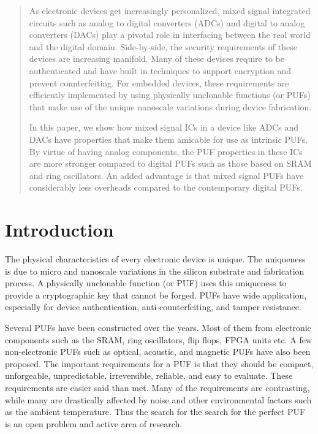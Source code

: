 \begin{abstract}
As electronic devices get increasingly personalized,
mixed signal integrated circuits such as analog to digital converters (ADCs)
and digital to analog converters (DACs) play a pivotal role in interfacing 
between the real world and the digital domain. Side-by-side, the security
requirements of these devices are increasing manifold. Many of these devices
require to be authenticated and have built in techniques to support 
encryption and prevent counterfeiting. For embedded devices, 
these requirements are efficiently implemented by 
using physically unclonable functions (or PUFs) that make use of the 
unique nanoscale variations during device fabrication.

In this paper, we show how mixed signal ICs in a device like ADCs and DACs 
have properties that make them amicable for use as intrinsic PUFs. By
virtue of having analog components, the PUF properties in these ICs
are more stronger compared to digital PUFs such as those based on
SRAM and ring oscillators. An added advantage is that mixed signal PUFs
have considerably less overheads compared to the contemporary digital PUFs. 
\end{abstract}

\section{Introduction}
The physical characteristics of every electronic device is unique.
The uniqueness is due to micro and nanoscale variations in the 
silicon substrate and fabrication process. A physically unclonable function 
(or PUF) uses this uniqueness to provide a cryptographic key that 
cannot be forged. PUFs have wide application, especially for device
authentication, anti-counterfeiting, and tamper resistance.

Several PUFs have been constructed over the years. Most of them
from electronic components such as the SRAM, ring oscillators, flip flops,
FPGA units etc. A few non-electronic PUFs such as optical, acoustic,
and magnetic PUFs have also been proposed. The important requirements
for a PUF is that they should be compact, unforgeable, unpredictable, 
irreversible, reliable, and easy to evaluate. These requirements are 
easier said than met. Many of the requirements are contrasting, while 
many are drastically affected by noise and other environmental factors 
such as the ambient temperature. Thus the search for the search for 
the perfect PUF is an open problem and active area of research.

